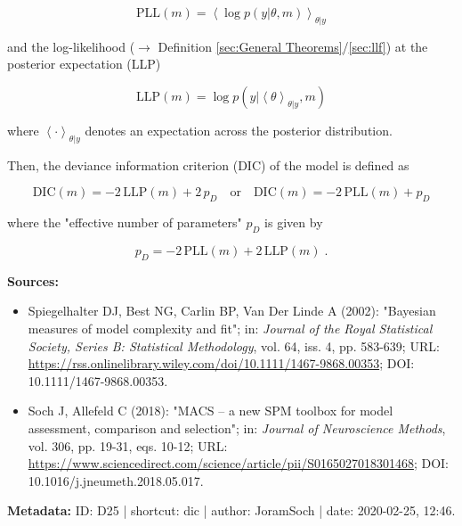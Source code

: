 \documentclass[a4paper,12pt,twoside]{book}
\begin{document}
\begin{equation} \label{eq:dic-PLL}
\mathrm{PLL}(m) = \left\langle \log p(y|\theta,m) \right\rangle_{\theta|y}
\end{equation}

and the log-likelihood ($\rightarrow$ Definition \ref{sec:General Theorems}/\ref{sec:llf}) at the posterior expectation (LLP)

\begin{equation} \label{eq:dic-LLP}
\mathrm{LLP}(m) = \log p(y|\left\langle \theta \right\rangle_{\theta|y},m)
\end{equation}

where $\left\langle \cdot \right\rangle_{\theta \vert y}$ denotes an expectation across the posterior distribution.

Then, the deviance information criterion (DIC) of the model is defined as

\begin{equation} \label{eq:dic-DIC}
\mathrm{DIC}(m) = -2 \, \mathrm{LLP}(m) + 2 \, p_D \quad \text{or} \quad \mathrm{DIC}(m) = -2 \, \mathrm{PLL}(m) + p_D
\end{equation}

where the "effective number of parameters" $p_D$ is given by

\begin{equation} \label{eq:dic-DIC-pD}
p_D = -2 \, \mathrm{PLL}(m) +2 \, \mathrm{LLP}(m) \; .
\end{equation}


\vspace{1em}
\textbf{Sources:}
\begin{itemize}
\item Spiegelhalter DJ, Best NG, Carlin BP, Van Der Linde A (2002): "Bayesian measures of model complexity and fit"; in: \textit{Journal of the Royal Statistical Society, Series B: Statistical Methodology}, vol. 64, iss. 4, pp. 583-639; URL: \url{https://rss.onlinelibrary.wiley.com/doi/10.1111/1467-9868.00353}; DOI: 10.1111/1467-9868.00353.
\item Soch J, Allefeld C (2018): "MACS – a new SPM toolbox for model assessment, comparison and selection"; in: \textit{Journal of Neuroscience Methods}, vol. 306, pp. 19-31, eqs. 10-12; URL: \url{https://www.sciencedirect.com/science/article/pii/S0165027018301468}; DOI: 10.1016/j.jneumeth.2018.05.017.
\end{itemize}


\vspace{1em}
\textbf{Metadata:} ID: D25 | shortcut: dic | author: JoramSoch | date: 2020-02-25, 12:46.
\vspace{1em}
\end{document}
